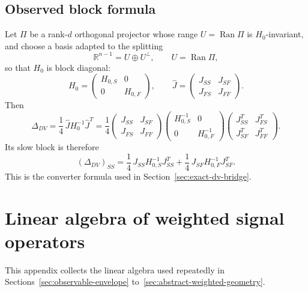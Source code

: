\documentclass[11pt,a4paper]{article}
\numberwithin{equation}{section}
\theoremstyle{thmcompact}
\theoremstyle{remark}
\begin{document}
\subsection{Observed block formula}

Let \(\Pi\) be a rank-\(d\) orthogonal projector whose range \(U=\operatorname{Ran}\Pi\) is \(H_0\)-invariant, and choose a basis adapted to the splitting
\begin{equation}
\mathbb R^{n-1}=U\oplus U^\perp,
\qquad U=\operatorname{Ran}\Pi,
\end{equation}
so that \(H_0\) is block diagonal:
\begin{equation}
H_0=
\begin{pmatrix}
H_{0,S} & 0\\
0 & H_{0,F}
\end{pmatrix},
\qquad
\widehat J=
\begin{pmatrix}
J_{SS} & J_{SF}\\
J_{FS} & J_{FF}
\end{pmatrix}.
\end{equation}
Then
\begin{equation}
\Delta_{DV}
=
\frac14\,
\widehat J H_0^{-1}\widehat J^T
=
\frac14
\begin{pmatrix}
J_{SS} & J_{SF}\\
J_{FS} & J_{FF}
\end{pmatrix}
\begin{pmatrix}
H_{0,S}^{-1} & 0\\
0 & H_{0,F}^{-1}
\end{pmatrix}
\begin{pmatrix}
J_{SS}^T & J_{FS}^T\\
J_{SF}^T & J_{FF}^T
\end{pmatrix}.
\end{equation}
Its slow block is therefore
\begin{equation}
(\Delta_{DV})_{SS}
=
\frac14\,J_{SS}H_{0,S}^{-1}J_{SS}^T
+
\frac14\,J_{SF}H_{0,F}^{-1}J_{SF}^T.
\end{equation}
This is the converter formula used in Section~\ref{sec:exact-dv-bridge}.

\section{Linear algebra of weighted signal operators}
\label{app:weighted_linear_algebra}

This appendix collects the linear algebra used repeatedly in Sections~\ref{sec:observable-envelope} to~\ref{sec:abstract-weighted-geometry}.
\end{document}
